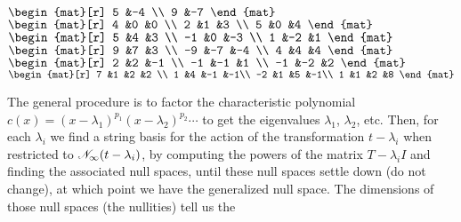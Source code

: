 \begin{exercises}
\begin{exparts*}
      \partsitem 
        \(
        \begin{mat}[r]
           5   &-4 \\
           9   &-7
        \end{mat} \)
      \partsitem 
        \(
        \begin{mat}[r]
           4   &0    &0  \\
           2   &1    &3  \\
           5   &0    &4
        \end{mat} \)
      \partsitem 
        \(
        \begin{mat}[r]
           5   &4    &3  \\
          -1   &0    &-3 \\
           1   &-2   &1
        \end{mat} \)
      \partsitem
        \(
        \begin{mat}[r]
           9   &7    &3  \\
          -9   &-7   &-4 \\
           4   &4    &4
        \end{mat} \)
      \partsitem 
        \(
        \begin{mat}[r]
           2   &2    &-1 \\
          -1   &-1   &1  \\
          -1   &-2   &2
        \end{mat} \)
      \partsitem 
        \(
        \begin{mat}[r]
           7   &1    &2   &2 \\
           1   &4    &-1  &-1\\
          -2   &1    &5   &-1\\
           1   &1    &2   &8
        \end{mat} \)
    \end{exparts*}
    \begin{answer}
      The general procedure is to factor the characteristic polynomial 
      $c(x)=(x-\lambda_1)^{p_1}(x-\lambda_2)^{p_2}\cdots $ 
      to get the eigenvalues $\lambda_1$, $\lambda_2$, etc. 
      Then, for each $\lambda_i$ we find a 
      string basis for the action of the transformation $t-\lambda_i$
      when restricted to $\mathscr{N}_\infty(t-\lambda_i)$,
      by computing the powers of the matrix $T-\lambda_iI$ and finding
      the associated null spaces, until these null spaces settle down
      (do not change), at which point we have the generalized null space.
      The dimensions of those null spaces (the nullities) tell us the

\end{answer}
\end{exercises}
